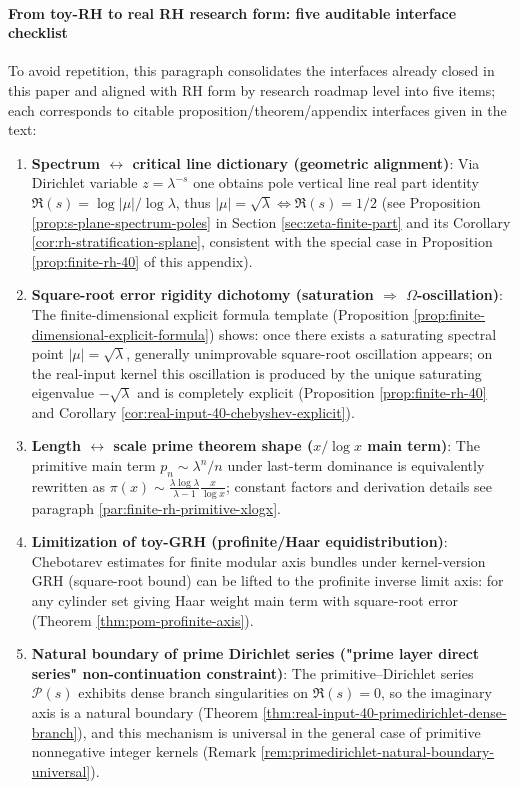 \paragraph{From toy-RH to real RH research form: five auditable interface checklist}\label{par:finite-rh-rhstyle-toolkit}
To avoid repetition, this paragraph consolidates the interfaces already closed in this paper and aligned with RH form by research roadmap level into five items; each corresponds to citable proposition/theorem/appendix interfaces given in the text:
\begin{enumerate}
  \item \textbf{Spectrum \(\leftrightarrow\) critical line dictionary (geometric alignment)}:
  Via Dirichlet variable \(z=\lambda^{-s}\) one obtains pole vertical line real part identity \(\Re(s)=\log|\mu|/\log\lambda\), thus \(|\mu|=\sqrt{\lambda}\iff \Re(s)=1/2\) (see Proposition \ref{prop:s-plane-spectrum-poles} in Section \ref{sec:zeta-finite-part} and its Corollary \ref{cor:rh-stratification-splane}, consistent with the special case in Proposition \ref{prop:finite-rh-40} of this appendix).
  \item \textbf{Square-root error rigidity dichotomy (saturation \(\Rightarrow\) \(\Omega\)-oscillation)}:
  The finite-dimensional explicit formula template (Proposition \ref{prop:finite-dimensional-explicit-formula}) shows: once there exists a saturating spectral point \(|\mu|=\sqrt{\lambda}\), generally unimprovable square-root oscillation appears; on the real-input kernel this oscillation is produced by the unique saturating eigenvalue \(-\sqrt{\lambda}\) and is completely explicit (Proposition \ref{prop:finite-rh-40} and Corollary \ref{cor:real-input-40-chebyshev-explicit}).
  \item \textbf{Length \(\leftrightarrow\) scale prime theorem shape (\(x/\log x\) main term)}:
  The primitive main term \(p_n\sim \lambda^n/n\) under last-term dominance is equivalently rewritten as \(\pi(x)\sim \frac{\lambda\log\lambda}{\lambda-1}\frac{x}{\log x}\); constant factors and derivation details see paragraph \ref{par:finite-rh-primitive-xlogx}.
  \item \textbf{Limitization of toy-GRH (profinite/Haar equidistribution)}:
  Chebotarev estimates for finite modular axis bundles under kernel-version GRH (square-root bound) can be lifted to the profinite inverse limit axis: for any cylinder set giving Haar weight main term with square-root error (Theorem \ref{thm:pom-profinite-axis}).
  \item \textbf{Natural boundary of prime Dirichlet series ("prime layer direct series" non-continuation constraint)}:
  The primitive--Dirichlet series \(\mathcal{P}(s)\) exhibits dense branch singularities on \(\Re(s)=0\), so the imaginary axis is a natural boundary (Theorem \ref{thm:real-input-40-primedirichlet-dense-branch}), and this mechanism is universal in the general case of primitive nonnegative integer kernels (Remark \ref{rem:primedirichlet-natural-boundary-universal}).
\end{enumerate}
